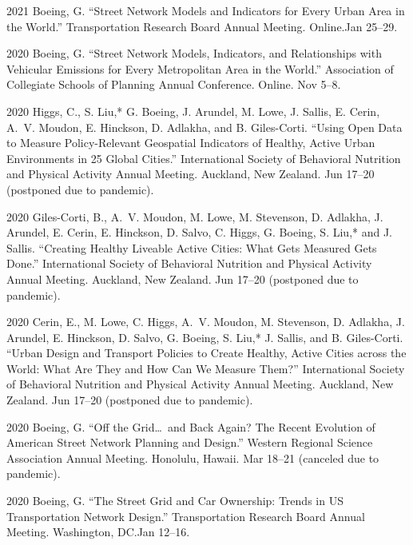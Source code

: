 \documentclass[12pt,letterpaper]{report}
\begin{document}
\begin{tablist}
        \item[2021] \tab{}Boeing, G. \enquote{Street Network Models and Indicators for Every Urban Area in the World.} Transportation Research Board Annual Meeting. Online.\@ Jan 25--29.

        \item[2020] \tab{}Boeing, G. \enquote{Street Network Models, Indicators, and Relationships with Vehicular Emissions for Every Metropolitan Area in the World.} Association of Collegiate Schools of Planning Annual Conference. Online. Nov 5--8.

        \item[2020] \tab{}Higgs, C., S. Liu,* G. Boeing, J. Arundel, M. Lowe, J. Sallis, E. Cerin, A.~V. Moudon, E. Hinckson, D. Adlakha, and B. Giles-Corti. \enquote{Using Open Data to Measure Policy-Relevant Geospatial Indicators of Healthy, Active Urban Environments in 25 Global Cities.} International Society of Behavioral Nutrition and Physical Activity Annual Meeting. Auckland, New Zealand. Jun 17--20 (postponed due to pandemic).

        \item[2020] \tab{}Giles-Corti, B., A.~V. Moudon, M. Lowe, M. Stevenson, D. Adlakha, J. Arundel, E. Cerin, E. Hinckson, D. Salvo, C. Higgs, G. Boeing, S. Liu,* and J. Sallis. \enquote{Creating Healthy Liveable Active Cities: What Gets Measured Gets Done.} International Society of Behavioral Nutrition and Physical Activity Annual Meeting. Auckland, New Zealand. Jun 17--20 (postponed due to pandemic).

        \item[2020] \tab{}Cerin, E., M. Lowe, C. Higgs, A.~V. Moudon, M. Stevenson, D. Adlakha, J. Arundel, E. Hinckson, D. Salvo, G. Boeing, S. Liu,* J. Sallis, and B. Giles-Corti. \enquote{Urban Design and Transport Policies to Create Healthy, Active Cities across the World: What Are They and How Can We Measure Them?} International Society of Behavioral Nutrition and Physical Activity Annual Meeting. Auckland, New Zealand. Jun 17--20 (postponed due to pandemic).

        \item[2020] \tab{}Boeing, G. \enquote{Off the Grid\ldots\ and Back Again? The Recent Evolution of American Street Network Planning and Design.} Western Regional Science Association Annual Meeting. Honolulu, Hawaii. Mar 18--21 (canceled due to pandemic).

        \item[2020] \tab{}Boeing, G. \enquote{The Street Grid and Car Ownership: Trends in US Transportation Network Design.} Transportation Research Board Annual Meeting. Washington, DC.\@ Jan 12--16.


\end{tablist}
\end{document}
